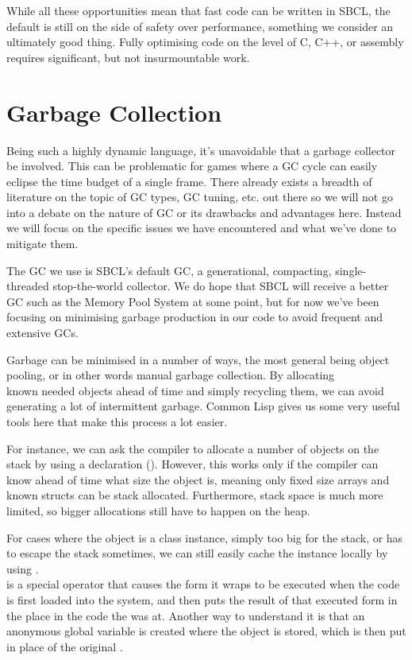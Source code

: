\documentclass[a4paper]{paper}
\begin{document}
While all these opportunities mean that fast code can be written in SBCL, the default is still on the side of safety over performance, something we consider an ultimately good thing. Fully optimising code on the level of C, C++, or assembly requires significant, but not insurmountable work.

\section{Garbage Collection}
Being such a highly dynamic language, it's unavoidable that a garbage collector be involved. This can be problematic for games where a GC cycle can easily eclipse the time budget of a single frame. There already exists a breadth of literature on the topic of GC types, GC tuning, etc. out there so we will not go into a debate on the nature of GC or its drawbacks and advantages here. Instead we will focus on the specific issues we have encountered and what we've done to mitigate them.

The GC we use is SBCL's default GC, a generational, compacting, single-threaded stop-the-world collector. We do hope that SBCL will receive a better GC such as the Memory Pool System\cite{brooksby2002memory} at some point, but for now we've been focusing on minimising garbage production in our code to avoid frequent and extensive GCs.

Garbage can be minimised in a number of ways, the most general being object pooling, or in other words manual garbage collection. By allocating\\known needed objects ahead of time and simply recycling them, we can avoid generating a lot of intermittent garbage. Common Lisp gives us some very useful tools here that make this process a lot easier.

For instance, we can ask the compiler to allocate a number of objects on the stack by using a declaration (). However, this works only if the compiler can know ahead of time what size the object is, meaning only fixed size arrays and known structs can be stack allocated. Furthermore, stack space is much more limited, so bigger allocations still have to happen on the heap.

For cases where the object is a class instance, simply too big for the stack, or has to escape the stack sometimes, we can still easily cache the instance locally by using .\\ is a special operator that causes the form it wraps to be executed when the code is first loaded into the system, and then puts the result of that executed form in the place in the code the  was at. Another way to understand it is that an anonymous global variable is created where the object is stored, which is then put in place of the original .
\end{document}

